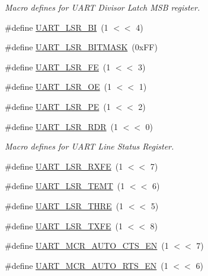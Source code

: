 \begin{DoxyCompactItemize}
\begin{DoxyCompactList}\small\item\em Macro defines for U\+A\+RT Divisor Latch M\+SB register. \end{DoxyCompactList}\item 
\#define \hyperlink{group__UART__17XX__40XX_gaaca4bb43e62c7085534b67576e1ddbeb}{U\+A\+R\+T\+\_\+\+L\+S\+R\+\_\+\+BI}~(1 $<$$<$ 4)
\item 
\#define \hyperlink{group__UART__17XX__40XX_ga3643d58e12f1d3bf342d140a5e3cb1ae}{U\+A\+R\+T\+\_\+\+L\+S\+R\+\_\+\+B\+I\+T\+M\+A\+SK}~(0x\+F\+F)
\item 
\#define \hyperlink{group__UART__17XX__40XX_ga18b1661d7c37ab40c9310311dd4f647d}{U\+A\+R\+T\+\_\+\+L\+S\+R\+\_\+\+FE}~(1 $<$$<$ 3)
\item 
\#define \hyperlink{group__UART__17XX__40XX_ga85c4312a700f6033bf0a075ae41de57c}{U\+A\+R\+T\+\_\+\+L\+S\+R\+\_\+\+OE}~(1 $<$$<$ 1)
\item 
\#define \hyperlink{group__UART__17XX__40XX_ga3ae0ee26be22b855aa08d68a2801d3d2}{U\+A\+R\+T\+\_\+\+L\+S\+R\+\_\+\+PE}~(1 $<$$<$ 2)
\item 
\#define \hyperlink{group__UART__17XX__40XX_ga3d83de31d722cd373ee69a2a38aaed43}{U\+A\+R\+T\+\_\+\+L\+S\+R\+\_\+\+R\+DR}~(1 $<$$<$ 0)
\begin{DoxyCompactList}\small\item\em Macro defines for U\+A\+RT Line Status Register. \end{DoxyCompactList}\item 
\#define \hyperlink{group__UART__17XX__40XX_ga5972ac77db6249142b482356427dcf7c}{U\+A\+R\+T\+\_\+\+L\+S\+R\+\_\+\+R\+X\+FE}~(1 $<$$<$ 7)
\item 
\#define \hyperlink{group__UART__17XX__40XX_gadb3f8bb82f0a253700fdb88d8c609710}{U\+A\+R\+T\+\_\+\+L\+S\+R\+\_\+\+T\+E\+MT}~(1 $<$$<$ 6)
\item 
\#define \hyperlink{group__UART__17XX__40XX_gae05118527ef8873b9d7b1b0be0153019}{U\+A\+R\+T\+\_\+\+L\+S\+R\+\_\+\+T\+H\+RE}~(1 $<$$<$ 5)
\item 
\#define \hyperlink{group__UART__17XX__40XX_ga1abf066d0f8b3400880a1909373cf699}{U\+A\+R\+T\+\_\+\+L\+S\+R\+\_\+\+T\+X\+FE}~(1 $<$$<$ 8)
\item 
\#define \hyperlink{group__UART__17XX__40XX_ga7769292aa692cb12dce90893fc992d2f}{U\+A\+R\+T\+\_\+\+M\+C\+R\+\_\+\+A\+U\+T\+O\+\_\+\+C\+T\+S\+\_\+\+EN}~(1 $<$$<$ 7)
\item 
\#define \hyperlink{group__UART__17XX__40XX_gae26cd92b527d6d6ec9f7fd98aeefd94a}{U\+A\+R\+T\+\_\+\+M\+C\+R\+\_\+\+A\+U\+T\+O\+\_\+\+R\+T\+S\+\_\+\+EN}~(1 $<$$<$ 6)
$$
\end{DoxyCompactItemize}
